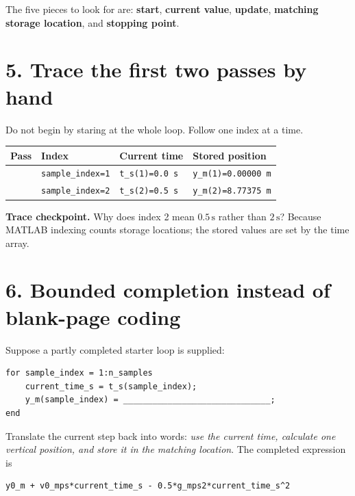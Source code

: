 \documentclass[11pt,a4paper]{article}
\newcommand{\units}[1]{\,\mathrm{#1}}
\begin{document}
The five pieces to look for are: \textbf{start}, \textbf{current value}, \textbf{update}, \textbf{matching storage location}, and \textbf{stopping point}.

\section*{5. Trace the first two passes by hand}
Do not begin by staring at the whole loop. Follow one index at a time.

\begin{center}\small\begin{tabular}{>{\raggedright\arraybackslash}p{.16\linewidth}>{\raggedright\arraybackslash}p{.20\linewidth}>{\raggedright\arraybackslash}p{.27\linewidth}>{\raggedright\arraybackslash}p{.25\linewidth}}\toprule
\textbf{Pass} & \textbf{Index} & \textbf{Current time} & \textbf{Stored position}\\ \midrule
1 & \texttt{sample\_index=1} & \texttt{t\_s(1)=0.0 s} & \texttt{y\_m(1)=0.00000 m}\\
2 & \texttt{sample\_index=2} & \texttt{t\_s(2)=0.5 s} & \texttt{y\_m(2)=8.77375 m}\\ \bottomrule
\end{tabular}\end{center}

\begin{checkbox}\textbf{Trace checkpoint.} Why does index 2 mean $0.5\units{s}$ rather than $2\units{s}$? Because MATLAB indexing counts storage locations; the stored values are set by the time array.\end{checkbox}

\section*{6. Bounded completion instead of blank-page coding}
Suppose a partly completed starter loop is supplied:
\begin{lstlisting}[style=matlabstyle,caption={Complete only the missing calculation}]
for sample_index = 1:n_samples
    current_time_s = t_s(sample_index);
    y_m(sample_index) = ______________________________;
end
\end{lstlisting}

Translate the current step back into words: \emph{use the current time, calculate one vertical position, and store it in the matching location}. The completed expression is
\begin{lstlisting}[style=matlabstyle,caption={Completed position expression for the current time}]
y0_m + v0_mps*current_time_s - 0.5*g_mps2*current_time_s^2
\end{lstlisting}
\end{document}
